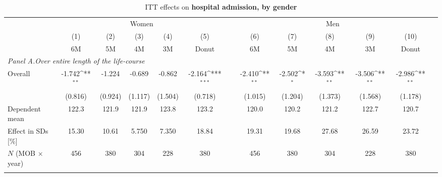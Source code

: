 \begin{landscape}
\vspace*{\fill}
 \begin{table}[H] \centering 
 	\begin{threeparttable} \centering \caption{ITT effects on \textbf{hospital admission, by gender}}\label{tab: DD_hospital2_female_male} {\def\sym#1{\ifmmode^{#1}\else\(^{#1}\)\fi} 
 			\begin{tabular}{l*{12}{c}}
 				\toprule 
 				& \multicolumn{5}{c}{Women} && \multicolumn{5}{c}{Men} \\ 
 				\cmidrule(lr){2-6} \cmidrule(lr){8-12}
 				&\multicolumn{1}{c}{(1)}&\multicolumn{1}{c}{(2)}&\multicolumn{1}{c}{(3)}&\multicolumn{1}{c}{(4)}&\multicolumn{1}{c}{(5)}&\multicolumn{1}{c}{        }&\multicolumn{1}{c}{(6)}&\multicolumn{1}{c}{(7)}&\multicolumn{1}{c}{(8)}&\multicolumn{1}{c}{(9)}&\multicolumn{1}{c}{(10)}\\
 				&\multicolumn{1}{c}{6M}&\multicolumn{1}{c}{5M}&\multicolumn{1}{c}{4M}&\multicolumn{1}{c}{3M}&\multicolumn{1}{c}{Donut}&&\multicolumn{1}{c}{6M}&\multicolumn{1}{c}{5M}&\multicolumn{1}{c}{4M}&\multicolumn{1}{c}{3M}&\multicolumn{1}{c}{Donut}\\
 				\midrule
 				\multicolumn{5}{l}{\emph{Panel A.Over entire length of the life-course}} \\

 				\hspace*{10pt}Overall		&      -1.742\sym{**} &      -1.224         &      -0.689         &      -0.862         &      -2.164\sym{***} &&      -2.410\sym{**} &      -2.502\sym{*}  &      -3.593\sym{**} &      -3.506\sym{**} &      -2.986\sym{**} \\
				                    		&     (0.816)         &     (0.924)         &     (1.117)         &     (1.504)         &     (0.718)          &&     (1.015)         &     (1.204)         &     (1.373)         &     (1.568)         &     (1.178)         \\
				\midrule Dependent mean		&       122.3         &       121.9         &       121.9         &       123.8         &       123.2          &&       120.0         &       120.2         &       121.2         &       122.7         &       120.7         \\
				Effect in SDs [\%]  		&       15.30         &       10.61         &       5.750         &       7.350         &       18.84          &&       19.31         &       19.68         &       27.68         &       26.59         &       23.72         \\
				\(N\) (MOB $\times$ year)	&         456         &         380         &         304         &         228         &         380          &&         456         &         380         &         304         &         228         &         380         \\
 				\\


\end{tabular}}
\end{threeparttable}
\end{table}
\end{landscape}
